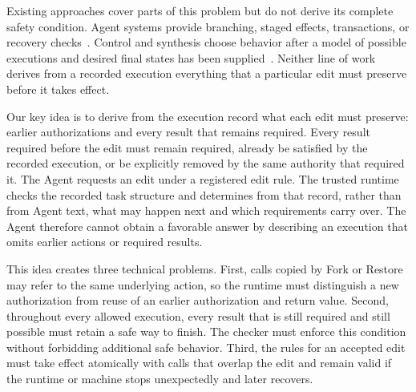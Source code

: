 Existing approaches cover parts of this problem but do not derive its complete safety condition.
Agent systems provide branching, staged effects, transactions, or recovery checks~\cite{yu2026shepherd,li2025agentgit,langchain2026timetravel,patil2024goex,chang2025sagallm,mohammadi2026atomix,chen2026cordon,yang2026dart}.
Control and synthesis choose behavior after a model of possible executions and desired final states has been supplied~\cite{dequeiroz2005multitasking,malik2008generalised,finkbeiner2022live,aceto2018suppressions}.
Neither line of work derives from a recorded execution everything that a particular edit must preserve before it takes effect.

Our key idea is to derive from the execution record what each edit must preserve: earlier authorizations and every result that remains required.
Every result required before the edit must remain required, already be satisfied by the recorded execution, or be explicitly removed by the same authority that required it.
The Agent requests an edit under a registered edit rule.
The trusted runtime checks the recorded task structure and determines from that record, rather than from Agent text, what may happen next and which requirements carry over.
The Agent therefore cannot obtain a favorable answer by describing an execution that omits earlier actions or required results.

This idea creates three technical problems.
First, calls copied by Fork or Restore may refer to the same underlying action, so the runtime must distinguish a new authorization from reuse of an earlier authorization and return value.
Second, throughout every allowed execution, every result that is still required and still possible must retain a safe way to finish.
The checker must enforce this condition without forbidding additional safe behavior.
Third, the rules for an accepted edit must take effect atomically with calls that overlap the edit and remain valid if the runtime or machine stops unexpectedly and later recovers.

